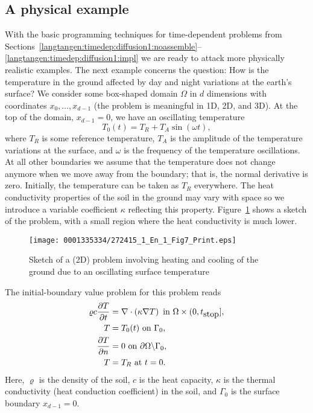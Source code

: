 \subsection{A physical example}
\label{langtangen:timedep:diffusion2:sin}

With the basic programming techniques for time-dependent problems from
Sections~\ref{langtangen:timedep:diffusion1:noassemble}--\ref{langtangen:timedep:diffusion1:impl}
we are ready to attack more physically realistic examples.  The next
example concerns the question: How is the temperature in the ground
affected by day and night variations at the earth's surface?  We consider
some box-shaped domain $\Omega$ in $d$ dimensions with coordinates
$x_0,\ldots,x_{d-1}$ (the problem is meaningful in 1D, 2D, and 3D).
At the top of the domain, $x_{d-1}=0$, we have an oscillating temperature
\begin{equation}
  T_0(t) = T_R + T_A\sin (\omega t),
\end{equation}
where $T_R$ is some reference temperature, $T_A$ is the amplitude
of the temperature variations at the surface, and $\omega$ is the
frequency of the temperature oscillations.  At all other boundaries
we assume that the temperature does not change anymore when we
move away from the boundary; that is, the normal derivative is zero.
Initially, the temperature can be taken as $T_R$ everywhere.  The heat
conductivity properties of the soil in the ground may vary with space so
we introduce a variable coefficient $\kappa$ reflecting this property.
Figure~\ref{langtangen:timedep:diffusion2:sin:fig1} shows a sketch of the
problem, with a small region where the heat conductivity is much lower.

\begin{figure}
  \centering
  \texttt{[image: 0001335334/272415\_1\_En\_1\_Fig7\_Print.eps]}
  \caption{Sketch of a (2D) problem involving heating and cooling of
    the ground due to an oscillating surface temperature}
  \label{langtangen:timedep:diffusion2:sin:fig1}
\end{figure}

The initial-boundary value problem for this problem reads
\begin{align}
\varrho c \frac{\partial T}{\partial t}
    &= \nabla\cdot\left( \kappa\nabla T\right)\hbox{ in }\Omega\times (0,t_{\hbox{stop}}],
\\
T &= T_0(t)\hbox{ on }\Gamma_0,
\\
\frac{\partial T}{\partial n} &= 0\hbox{ on }\partial\Omega\backslash\Gamma_0,
\\
T &= T_R\hbox{ at }t =0.
\end{align}
Here, $\varrho$ is the density of the soil, $c$ is the heat capacity,
$\kappa$ is the thermal conductivity (heat conduction coefficient)
in the soil, and $\Gamma_0$ is the surface boundary $x_{d-1}=0$.

